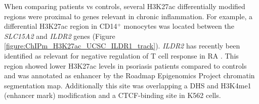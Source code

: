 When comparing patients vs controls, several H3K27ac differentially modified regions were proximal to genes relevant in chronic inflammation. For example, a differential H3K27ac region in CD14$^+$ monocytes was located between the \textit{SLC15A2} and \textit{ILDR2} genes (Figure \ref{figure:ChIPm_H3K27ac_UCSC_ILDR1_track}). \textit{ILDR2} has recently been identified as relevant for negative regulation of T cell response in RA \parencite{Hecht2018}. This region showed lower H3K27ac levels in psoriasis patients compared to controls and was annotated as enhancer by the Roadmap Epigenomics Project chromatin segmentation map. Additionally this site was overlapping a DHS and H3K4me1 (enhancer mark) modification and a CTCF-binding site in K562 cells. %





